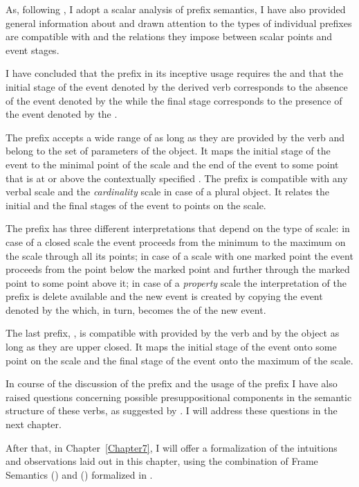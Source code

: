 As, following \citet{Kagan:book}, I adopt a scalar analysis of prefix semantics, I have also provided general information about  and drawn attention to the types of  individual prefixes are compatible with and the relations they impose between scalar points and event stages. 

I have concluded that the prefix  in its inceptive usage requires the  and that the initial stage of the event denoted by the derived verb corresponds to the absence of the event denoted by the  while the final stage corresponds to the presence of the event denoted by the . 

The prefix  accepts a wide range of  as long as they are provided by the verb and belong to the set of parameters of the object. It maps the initial stage of the event to the minimal point of the scale and the end of the event to some point that is at or above the contextually specified . The prefix  is compatible with any verbal scale and the \textit{cardinality} scale in case of a plural object. It relates the initial and the final stages of the event to points on the scale. 

The prefix  has three different interpretations that depend on the type of scale: in case of a closed scale the event proceeds from the minimum to the maximum on the scale through all its points; in case of a scale with one marked point the event proceeds from the point below the marked point and further through the marked point to some point above it; in case of a \textit{property} scale the  interpretation of the prefix is delete available and the new event is created by copying the event denoted by the  which, in turn, becomes the  of the new event. 

The last prefix, , is compatible with  provided by the verb and by the object as long as they are upper closed. It maps the initial stage of the event onto some point on the scale and the final stage of the event onto the maximum of the scale. 

In course of the discussion of the prefix  and the  usage of the prefix  I have also raised questions concerning possible presuppositional components in the semantic structure of these verbs, as suggested by \citet{Kagan:book}. I will address these questions in the next chapter.

After that, in Chapter~\ref{Chapter7}, I will offer a formalization of the intuitions and observations laid out in this chapter, using the combination of Frame Semantics (\citealt{Fillmore:82}) and  (\citealt{JoshiSchabes:97}) formalized in \citealt{KallmeyerOsswald:13}. 

